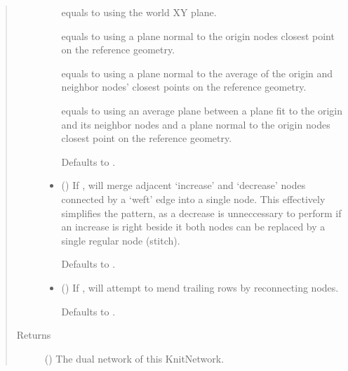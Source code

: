 \documentclass[letterpaper,10pt,english]{sphinxmanual}
\begin{document}
\begin{fulllineitems}
\begin{fulllineitems}
\begin{quote}
\begin{description}
\begin{itemize}
 equals to using the world XY plane.

 equals to using a plane normal to the origin nodes closest
point on the reference geometry.

 equals to using a plane normal to the average of the origin
and neighbor nodes’ closest points on the reference geometry.

 equals to using an average plane between a plane fit to the
origin and its neighbor nodes and a plane normal to the origin
nodes closest point on the reference geometry.

Defaults to .


\item {} 
 (\sphinxstyleliteralemphasis{\sphinxupquote{, }}) \textendash{} 
If , will merge adjacent ‘increase’ and ‘decrease’ nodes
connected by a ‘weft’ edge into a single node. This effectively
simplifies the pattern, as a decrease is unneccessary to perform
if an increase is right beside it \sphinxhyphen{} both nodes can be replaced by a
single regular node (stitch).

Defaults to .


\item {} 
 (\sphinxstyleliteralemphasis{\sphinxupquote{, }}) \textendash{} 
If , will attempt to mend trailing rows by reconnecting
nodes.

Defaults to .


\end{itemize}

\item[{Returns}] \leavevmode
{} ({\hyperref[\detokenize{cockatoo:cockatoo.KnitDiNetwork}]{}}) \textendash{} The dual network of this KnitNetwork.


\end{description}
\end{quote}
\end{fulllineitems}
\end{fulllineitems}
\end{document}
